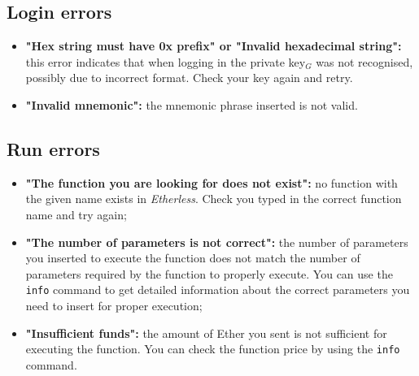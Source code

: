   \subsection{Login errors}
  \begin{itemize}
  	\item \textbf{"Hex string must have 0x prefix" or "Invalid hexadecimal string":} this error indicates that when logging in the private key$_{G}$ was not recognised, possibly due to incorrect format. Check your key again and retry.
  	\item \textbf{"Invalid mnemonic":} the mnemonic phrase inserted is not valid.
  \end{itemize}
    
  \subsection{Run errors}
  \begin{itemize}
    \item \textbf{"The function you are looking for does not exist":} no function with the given name exists in \textit{Etherless}. Check you typed in the correct function name and try again;
     \item \textbf{"The number of parameters is not correct":} the number of parameters you inserted to execute the function does not match the number of parameters required by the function to properly execute. You can use the \texttt{info} command to get detailed information about the correct parameters you need to insert for proper execution;
      \item \textbf{"Insufficient funds":} the amount of Ether you sent is not sufficient for executing the function. You can check the function price by using the \texttt{info} command.
  \end{itemize}
  

